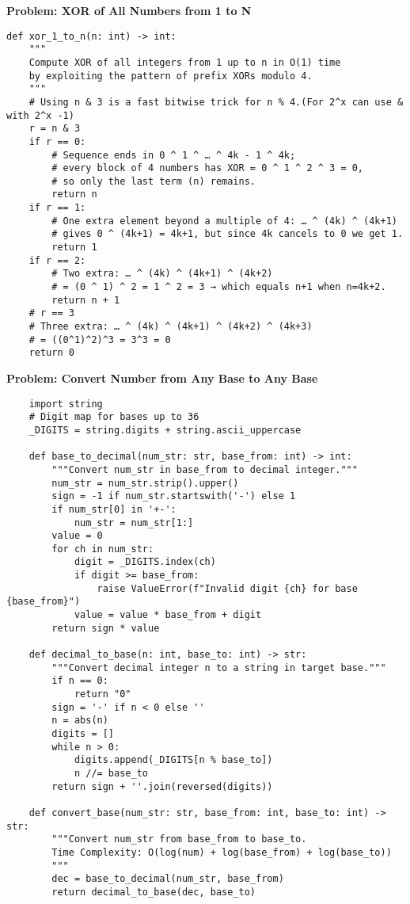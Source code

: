     \noindent\textbf{Problem: XOR of All Numbers from 1 to N}
    \begin{verbatim}
def xor_1_to_n(n: int) -> int:
    """
    Compute XOR of all integers from 1 up to n in O(1) time
    by exploiting the pattern of prefix XORs modulo 4.
    """
    # Using n & 3 is a fast bitwise trick for n % 4.(For 2^x can use & with 2^x -1)
    r = n & 3
    if r == 0:
        # Sequence ends in 0 ^ 1 ^ … ^ 4k - 1 ^ 4k;
        # every block of 4 numbers has XOR = 0 ^ 1 ^ 2 ^ 3 = 0,
        # so only the last term (n) remains.
        return n
    if r == 1:
        # One extra element beyond a multiple of 4: … ^ (4k) ^ (4k+1)
        # gives 0 ^ (4k+1) = 4k+1, but since 4k cancels to 0 we get 1.
        return 1
    if r == 2:
        # Two extra: … ^ (4k) ^ (4k+1) ^ (4k+2)
        # = (0 ^ 1) ^ 2 = 1 ^ 2 = 3 → which equals n+1 when n=4k+2.
        return n + 1
    # r == 3
    # Three extra: … ^ (4k) ^ (4k+1) ^ (4k+2) ^ (4k+3)
    # = ((0^1)^2)^3 = 3^3 = 0
    return 0

    \end{verbatim}
    \noindent\textbf{Problem: Convert Number from Any Base to Any Base}
    \begin{verbatim}
    import string
    # Digit map for bases up to 36
    _DIGITS = string.digits + string.ascii_uppercase

    def base_to_decimal(num_str: str, base_from: int) -> int:
        """Convert num_str in base_from to decimal integer."""
        num_str = num_str.strip().upper()
        sign = -1 if num_str.startswith('-') else 1
        if num_str[0] in '+-':
            num_str = num_str[1:]
        value = 0
        for ch in num_str:
            digit = _DIGITS.index(ch)
            if digit >= base_from:
                raise ValueError(f"Invalid digit {ch} for base {base_from}")
            value = value * base_from + digit
        return sign * value

    def decimal_to_base(n: int, base_to: int) -> str:
        """Convert decimal integer n to a string in target base."""
        if n == 0:
            return "0"
        sign = '-' if n < 0 else ''
        n = abs(n)
        digits = []
        while n > 0:
            digits.append(_DIGITS[n % base_to])
            n //= base_to
        return sign + ''.join(reversed(digits))

    def convert_base(num_str: str, base_from: int, base_to: int) -> str:
        """Convert num_str from base_from to base_to.
        Time Complexity: O(log(num) + log(base_from) + log(base_to))
        """
        dec = base_to_decimal(num_str, base_from)
        return decimal_to_base(dec, base_to)
    \end{verbatim}
